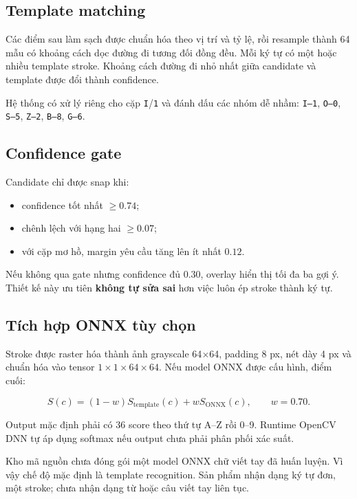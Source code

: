 \documentclass[12pt,a4paper,oneside]{report}
\begin{document}
\subsection{Template matching}

Các điểm sau làm sạch được chuẩn hóa theo vị trí và tỷ lệ, rồi resample thành 64 mẫu có khoảng cách dọc đường đi tương đối đồng đều. Mỗi ký tự có một hoặc nhiều template stroke. Khoảng cách đường đi nhỏ nhất giữa candidate và template được đổi thành confidence.

Hệ thống có xử lý riêng cho cặp \texttt{I}/\texttt{1} và đánh dấu các nhóm dễ nhầm:
\texttt{I--1}, \texttt{O--0}, \texttt{S--5}, \texttt{Z--2}, \texttt{B--8}, \texttt{G--6}.

\subsection{Confidence gate}

Candidate chỉ được snap khi:

\begin{itemize}
  \item confidence tốt nhất $\ge 0.74$;
  \item chênh lệch với hạng hai $\ge 0.07$;
  \item với cặp mơ hồ, margin yêu cầu tăng lên ít nhất $0.12$.
\end{itemize}

Nếu không qua gate nhưng confidence đủ 0.30, overlay hiển thị tối đa ba gợi ý. Thiết kế này ưu tiên \textbf{không tự sửa sai} hơn việc luôn ép stroke thành ký tự.

\subsection{Tích hợp ONNX tùy chọn}

Stroke được raster hóa thành ảnh grayscale 64$\times$64, padding 8 px, nét dày 4 px và chuẩn hóa vào tensor $1\times1\times64\times64$. Nếu model ONNX được cấu hình, điểm cuối:

\begin{equation}
  S(c)=(1-w)S_{\mathrm{template}}(c)+wS_{\mathrm{ONNX}}(c),
  \qquad w=0.70.
\end{equation}

Output mặc định phải có 36 score theo thứ tự A--Z rồi 0--9. Runtime OpenCV DNN tự áp dụng softmax nếu output chưa phải phân phối xác suất.

\begin{redbox}
Kho mã nguồn chưa đóng gói một model ONNX chữ viết tay đã huấn luyện. Vì vậy chế độ mặc định là template recognition. Sản phẩm nhận dạng ký tự đơn, một stroke; chưa nhận dạng từ hoặc câu viết tay liên tục.
\end{redbox}
\end{document}

